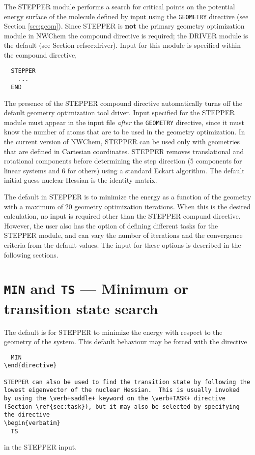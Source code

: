 \label{sec:stepper}

The STEPPER module performs a search for critical points on the
potential energy surface of the molecule defined by input using the
\verb+GEOMETRY+ directive (see Section \ref{sec:geom}).  Since STEPPER
is {\bf not} the primary geometry optimization module in NWChem the
compound directive is required; the DRIVER module is the default (see
Section {\LARGE ref{sec:driver}}).  Input for this module is
specified within the compound directive,

\begin{verbatim}
  STEPPER
    ...
  END
\end{verbatim}

The presence of the STEPPER compound directive automatically turns off
the default geometry optimization tool driver. Input specified for the
STEPPER module must appear in the input file {\em after} the
\verb+GEOMETRY+ directive, since it must know the number of atoms that
are to be used in the geometry optimization.  In the current version
of NWChem, STEPPER can be used only with geometries that are defined
in Cartesian coordinates.  STEPPER removes translational and
rotational components before determining the step direction (5
components for linear systems and 6 for others) using a standard
Eckart algorithm.  The default initial guess nuclear Hessian is the
identity matrix.

The default in STEPPER is to minimize the energy as a function of the
geometry with a maximum of 20 geometry optimization iterations.  When
this is the desired calculation, no input is required other than the
STEPPER compund directive.  However, the user also has the option of
defining different tasks for the STEPPER module, and can vary the
number of iterations and the convergence criteria from the default
values.  The input for these options is described in the following
sections.

\section{{\tt MIN} and {\tt TS} --- Minimum or transition state search}

The default is for STEPPER to minimize the energy with respect to the
geometry of the system.  This default behaviour may be forced with the
directive
\begin{verbatim}
  MIN
\end{directive}

STEPPER can also be used to find the transition state by following the
lowest eigenvector of the nuclear Hessian.  This is usually invoked 
by using the \verb+saddle+ keyword on the \verb+TASK+ directive
(Section \ref{sec:task}), but it may also be selected by specifying
the directive
\begin{verbatim}
  TS
\end{verbatim}
in the STEPPER input. 

